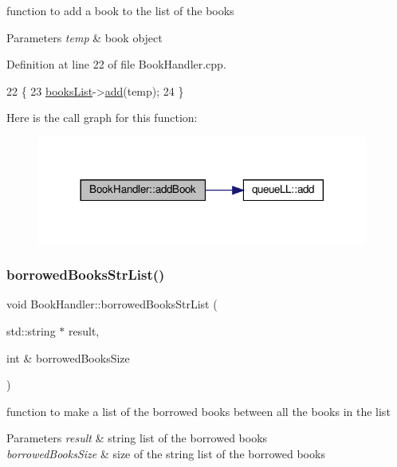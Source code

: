 function to add a book to the list of the books 
\begin{DoxyParams}{Parameters}
{\em temp} & book object \\
\hline
\end{DoxyParams}


Definition at line 22 of file Book\+Handler.\+cpp.


\begin{DoxyCode}
22                                      \{
23     \hyperlink{class_book_handler_a13a6c78422b3ad7acd5ebdb9555a0286}{booksList}->\hyperlink{classqueue_l_l_adcbcc26433da2c9d17b6cf0802d1d7d2}{add}(temp);
24 \}
\end{DoxyCode}
Here is the call graph for this function\+:
\nopagebreak
\begin{figure}[H]
\begin{center}
\leavevmode
\includegraphics[width=308pt]{class_book_handler_aac102920daa87a20f3e169f9c3cbc33b_cgraph}
\end{center}
\end{figure}
\mbox{\label{class_book_handler_ac0274027fa9375870ffb08fbb6377a7d}} 
\subsubsection{\texorpdfstring{borrowed\+Books\+Str\+List()}{borrowedBooksStrList()}}
{\footnotesize\ttfamily void Book\+Handler\+::borrowed\+Books\+Str\+List (\begin{DoxyParamCaption}\item[{std\+::string $\ast$}]{result,  }\item[{int \&}]{borrowed\+Books\+Size }\end{DoxyParamCaption})}

function to make a list of the borrowed books between all the books in the list 
\begin{DoxyParams}{Parameters}
{\em result} & string list of the borrowed books \\
\hline
{\em borrowed\+Books\+Size} & size of the string list of the borrowed books \\
\hline
\end{DoxyParams}



